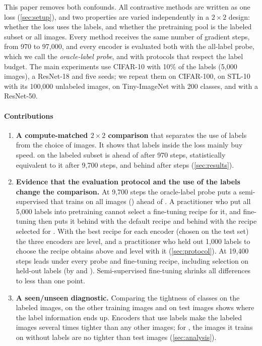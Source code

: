This paper removes both confounds. All contrastive methods are written as one loss
(\cref{sec:setup}), and two properties are varied independently in a $2\times2$ design: whether the loss
uses the labels, and whether the pretraining pool is the labeled subset or all images. Every method
receives the same number of gradient steps, from 970 to 97,000, and every encoder is evaluated both with the
all-label probe, which we call the \emph{oracle-label probe}, and with protocols that respect the label
budget. The main experiments use CIFAR-10 with 10\% of the labels (5,000 images), a ResNet-18 and five
seeds; we repeat them on CIFAR-100, on STL-10 with its 100,000 unlabeled images, on Tiny-ImageNet with 200
classes, and with a ResNet-50.

\paragraph{Contributions}
\begin{enumerate}[leftmargin=1.6em]
\item \textbf{A compute-matched $2\times2$ comparison} that separates the use of labels from the choice of
images. It shows that labels inside the loss mainly buy speed. \supcon on the labeled subset is
\pt ahead of \simclr after 970 steps, statistically equivalent to it after 9,700
steps, and \pt behind after  steps
(\cref{sec:results}).
\item \textbf{Evidence that the evaluation protocol and the use of the labels change the comparison.} At 9,700
steps the oracle-label probe puts a semi-supervised \supcon that trains on all images (\union)
\pt ahead of \simclr. A practitioner who put all 5,000 labels into pretraining
cannot select a fine-tuning recipe for it, and fine-tuning then puts it \pt
behind with the default recipe and \pt behind with the recipe selected for
\simclr. With the best recipe for each encoder (chosen on the test set) the three encoders are level, and a
practitioner who held out 1,000 labels to choose the recipe obtains \supcon {}\pt
above \simclr and \union level with it (\cref{sec:protocol}). At 19,400 steps \simclr leads under every probe and
fine-tuning recipe, including selection on held-out labels (by  and
\pt). Semi-supervised fine-tuning shrinks all differences to less than one point.
\item \textbf{A seen/unseen diagnostic.} Comparing the tightness of classes on the labeled images, on the
other training images and on test images shows where the label information ends up. Encoders that use
labels make the labeled images several times tighter than any other images; for \union, the images it trains
on without labels are no tighter than test images (\cref{sec:analysis}).
\end{enumerate}

